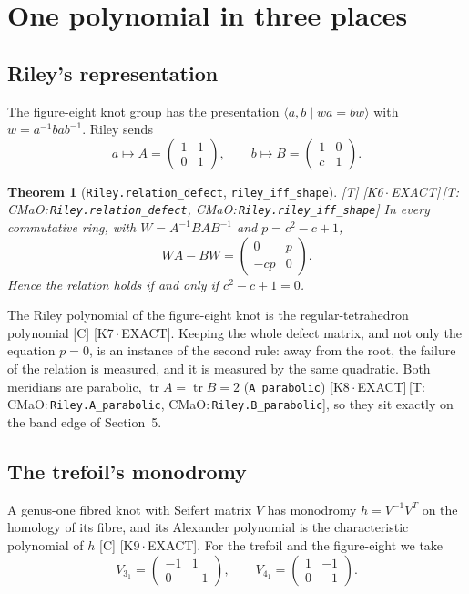 \documentclass[11pt]{article}
\newtheorem{theorem}{Theorem}
\theoremstyle{definition}
\newcommand{\grade}[1]{\textsf{\small[#1]}}
\newcommand{\lean}[1]{\texttt{\small #1}}
\newcommand{\dtag}[1]{#1}
\begin{document}
\section{One polynomial in three places}

\subsection{Riley's representation}
The figure-eight knot group has the presentation $\langle a,b\mid wa=bw\rangle$ with $w=a^{-1}bab^{-1}$. Riley \cite{Riley} sends
\[ a\mapsto A=\begin{pmatrix}1&1\\0&1\end{pmatrix},\qquad b\mapsto B=\begin{pmatrix}1&0\\c&1\end{pmatrix}. \]

\begin{theorem}[\lean{Riley.relation\_defect}, \lean{riley\_iff\_shape}]\grade{T}\dtag{ \textsf{\small[K6\,$\cdot$\,EXACT]}\,\textsf{\small[T:\,CMaO:\,\lean{Riley.\allowbreak{}relation\_\allowbreak{}defect}, CMaO:\,\lean{Riley.\allowbreak{}riley\_\allowbreak{}iff\_\allowbreak{}shape}]}}
In every commutative ring, with $W=A^{-1}BAB^{-1}$ and $p=c^2-c+1$,
\[ WA-BW=\begin{pmatrix}0&p\\-cp&0\end{pmatrix}. \]
Hence the relation holds if and only if $c^2-c+1=0$.
\end{theorem}

The Riley polynomial of the figure-eight knot is the regular-tetrahedron polynomial \grade{C} \cite{Riley,SilverWilliams}\dtag{ \textsf{\small[K7\,$\cdot$\,EXACT]}}. Keeping the whole defect matrix, and not only the equation $p=0$, is an instance of the second rule: away from the root, the failure of the relation is measured, and it is measured by the same quadratic. Both meridians are parabolic, $\operatorname{tr}A=\operatorname{tr}B=2$ (\lean{A\_parabolic})\dtag{ \textsf{\small[K8\,$\cdot$\,EXACT]}\,\textsf{\small[T:\,CMaO:\,\lean{Riley.\allowbreak{}A\_\allowbreak{}parabolic}, CMaO:\,\lean{Riley.\allowbreak{}B\_\allowbreak{}parabolic}]}}, so they sit exactly on the band edge of Section~5.

\subsection{The trefoil's monodromy}
A genus-one fibred knot with Seifert matrix $V$ has monodromy $h=V^{-1}V^{T}$ on the homology of its fibre, and its Alexander polynomial is the characteristic polynomial of $h$ \grade{C} \cite{Rolfsen}\dtag{ \textsf{\small[K9\,$\cdot$\,EXACT]}}. For the trefoil and the figure-eight we take
\[ V_{3_1}=\begin{pmatrix}-1&1\\0&-1\end{pmatrix},\qquad V_{4_1}=\begin{pmatrix}1&-1\\0&-1\end{pmatrix}. \]
\end{document}

